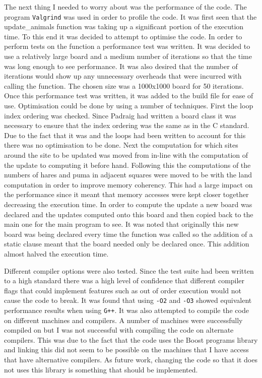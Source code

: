 \documentclass[12pt]{article}    %
\numberwithin{equation}{section}
\begin{document}
The next thing I needed to worry about was the performance of the code.
The program \texttt{Valgrind} was used in order to profile the code.
It was first seen that the update\_animals function was taking up a significant portion of the execution time.
To this end it was decided to attempt to optimise the code.
In order to perform tests on the function a performance test was written.
It was decided to use a relatively large board and a medium number of iterations so that the time was long enough to see performance.
It was also desired that the number of iterations would show up any unnecessary overheads that were incurred with calling the function.
The chosen size was a 1000x1000 board for 50 iterations.
Once this performance test was written, it was added to the build file for ease of use.
Optimisation could be done by using a number of techniques.
First the loop index ordering was checked.
Since Padraig had written a board class it was necessary to ensure that the index ordering was the same as in the C standard.
Due to the fact that it was and the loops had been written to account for this there was no optimisation to be done.
Next the computation for which sites around the site to be updated was moved from in-line with the computation of the update to computing it before hand.
Following this the computations of the numbers of hares and puma in adjacent squares were moved to be with the land computation in order to improve memory coherency.
This had a large impact on the performance since it meant that memory accesses were kept closer together decreasing the execution time.
In order to compute the update a new board was declared and the updates computed onto this board and then copied back to the main one for the main program to see.
It was noted that originally this new board was being declared every time the function was called so the addition of a static clause meant that the board needed only be declared once.
This addition almost halved the execution time.

Different compiler options were also tested.
Since the test suite had been written to a high standard there was a high level of confidence that different compiler flags that could implement features such as out of order execution would not cause the code to break.
It was found that using \texttt{-O2} and \texttt{-O3} showed equivalent performance results when using \texttt{G++}.
It was also attempted to compile the code on different machines and compilers.
A number of machines were successfully compiled on but I was not successful with compiling the code on alternate compilers.
This was due to the fact that the code uses the Boost programs library and linking this did not seem to be possible on the machines that I have access that have alternative compilers.
As future work, changing the code so that it does not uses this library is something that should be implemented.
\end{document}
